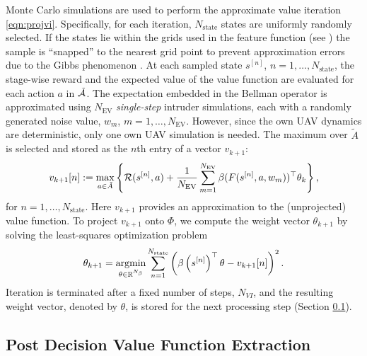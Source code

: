 Monte Carlo simulations are used to perform the approximate value iteration \eqref{eqn:projvi}. Specifically, for each iteration, $N_\text{state}$ states are uniformly randomly selected. If the states lie within the grids used in the feature function (see ) the sample is ``snapped'' to the nearest grid point to prevent approximation errors due to the Gibbs phenomenon \cite{JF-FBR:91}. At each sampled state $s^{[n]}$, $n=1,\ldots, N_\text{state}$, the stage-wise reward and the expected value of the value function are evaluated for each action $a$ in $\tilde{\mathcal{A}}$. The expectation embedded in the Bellman operator is approximated using $N_{\text{EV}}$ \emph{single-step} intruder simulations, each with a randomly generated noise value, $w_m$, $m=1,\ldots, N_{\text{EV}}$. However, since the own UAV dynamics are deterministic, only one own UAV simulation is needed. The maximum over $\tilde{A}$ is selected and stored as the $n$th entry of a vector $v_{k+1}$:
\begin{equation}
    v_{k+1}[n] := \max_{a \in \tilde{A}} \left\{\mathcal{R}(s^{[n]},a) + \frac{1}{N_{\text{EV}}}\sum_{m=1}^{N_{\text{EV}}} \beta(F(s^{[n]}, a, w_m))^\top \theta_k \right\} \text{,}
\end{equation}
for $n=1,\ldots, N_\text{state}$. Here $v_{k+1}$ provides an approximation to the (unprojected) value function. To project $v_{k+1}$ onto $\Phi$, we compute the weight vector $\theta_{k+1}$ by solving the least-squares optimization problem
\begin{equation}
    \theta_{k+1} = \underset{\theta\in \reals^{N_\beta}}{\argmin} \sum_{n=1}^{N_\text{state}} \left( \beta\left(s^{[n]}\right)^\top \theta - v_{k+1}[n] \right) ^2 \text{.}
\end{equation}
Iteration is terminated after a fixed number of steps, $N_{VI}$, and the resulting weight vector, denoted by $\theta$, is stored for the next processing step (Section \ref{sec:extract}).

\subsection{Post Decision Value Function Extraction} \label{sec:extract}

